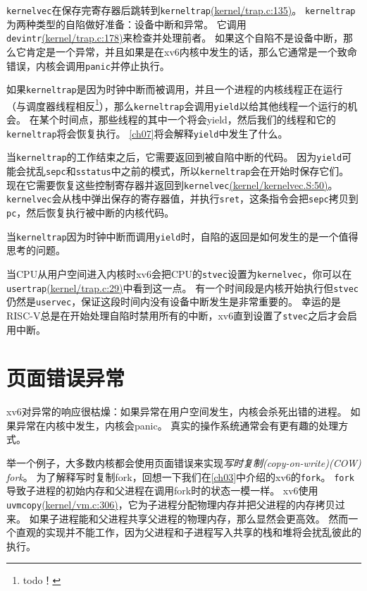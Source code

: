\texttt{kernelvec}在保存完寄存器后跳转到\texttt{kerneltrap}\href{https://github.com/mit-pdos/xv6-riscv/blob/risc/kernel/trap.c#L135}{(kernel/trap.c:135)}。
\texttt{kerneltrap}为两种类型的自陷做好准备：设备中断和异常。
它调用\texttt{devintr}\href{https://github.com/mit-pdos/xv6-riscv/blob/risc/kernel/trap.c#L178}{(kernel/trap.c:178)}来检查并处理前者。
如果这个自陷不是设备中断，那么它肯定是一个异常，并且如果是在xv6内核中发生的话，那么它通常是一个致命错误，内核会调用\texttt{panic}并停止执行。

如果\texttt{kerneltrap}是因为时钟中断而被调用，并且一个进程的内核线程正在运行（与调度器线程相反\footnote{todo！}），那么\texttt{kerneltrap}会调用\texttt{yield}以给其他线程一个运行的机会。
在某个时间点，那些线程的其中一个将会yield，然后我们的线程和它的\texttt{kerneltrap}将会恢复执行。
\autoref{ch07}将会解释\texttt{yield}中发生了什么。

当\texttt{kerneltrap}的工作结束之后，它需要返回到被自陷中断的代码。
因为\texttt{yield}可能会扰乱\texttt{sepc}和\texttt{sstatus}中之前的模式，所以\texttt{kerneltrap}会在开始时保存它们。
现在它需要恢复这些控制寄存器并返回到\texttt{kernelvec}\href{URL}{(kernel/kernelvec.S:50)}。
\texttt{kernelvec}会从栈中弹出保存的寄存器值，并执行\texttt{sret}，这条指令会把\texttt{sepc}拷贝到\texttt{pc}，然后恢复执行被中断的内核代码。

当\texttt{kerneltrap}因为时钟中断而调用\texttt{yield}时，自陷的返回是如何发生的是一个值得思考的问题。

当CPU从用户空间进入内核时xv6会把CPU的\texttt{stvec}设置为\texttt{kernelvec}，你可以在\texttt{usertrap}\href{https://github.com/mit-pdos/xv6-riscv/blob/risc/kernel/trap.c#L29}{(kernel/trap.c:29)}中看到这一点。
有一个时间段是内核开始执行但\texttt{stvec}仍然是\texttt{uservec}，保证这段时间内没有设备中断发生是非常重要的。
幸运的是RISC-V总是在开始处理自陷时禁用所有的中断，xv6直到设置了\texttt{stvec}之后才会启用中断。

\section{页面错误异常}\label{s4-6}
xv6对异常的响应很枯燥：如果异常在用户空间发生，内核会杀死出错的进程。
如果异常在内核中发生，内核会panic。
真实的操作系统通常会有更有趣的处理方式。

举一个例子，大多数内核都会使用页面错误来实现\emph{写时复制(copy-on-write)(COW) fork}。
为了解释写时复制fork，回想一下我们在\autoref{ch03}中介绍的xv6的\texttt{fork}。
\texttt{fork}导致子进程的初始内存和父进程在调用fork时的状态一模一样。
xv6使用\texttt{uvmcopy}\href{https://github.com/mit-pdos/xv6-riscv/blob/risc/kernel/vm.c#L306}{(kernel/vm.c:306)}，它为子进程分配物理内存并把父进程的内存拷贝过来。
如果子进程能和父进程共享父进程的物理内存，那么显然会更高效。
然而一个直观的实现并不能工作，因为父进程和子进程写入共享的栈和堆将会扰乱彼此的执行。

